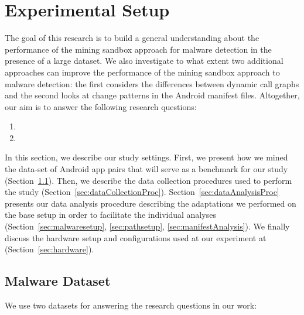 \section{Experimental Setup}\label{sec:experimentalSetup}


The goal of this research is to build a general understanding about
the performance of the mining sandbox approach for malware detection
in the presence of a large dataset. We also investigate to what
extent two additional approaches can improve the performance of the
mining sandbox approach to malware detection: the first considers
the differences between dynamic call graphs and the second looks at
change patterns in the Android manifest files. Altogether, our
aim is to answer the following research questions:

\begin{enumerate}[(RQ1)]
\item \rqa
\item \rqb
\end{enumerate}

In this section, we describe our study settings. First, we present how we mined the data-set of Android app pairs that will
serve as a benchmark for our study (Section~\ref{sec:dataset}).  Then, we describe the data collection procedures
used to perform the study (Section~\ref{sec:dataCollectionProc}). Section~\ref{sec:dataAnalysisProc} presents our data
analysis procedure describing the adaptations we performed on the base setup in order to facilitate the
individual analyses (Section~\ref{sec:malwaresetup}, \ref{sec:pathsetup}, \ref{sec:manifestAnalysis}).
We finally discuss the hardware setup and configurations used at our experiment at (Section~\ref{sec:hardware}).


\subsection{Malware Dataset}\label{sec:dataset}

We use two datasets for answering the research questions in our work:

